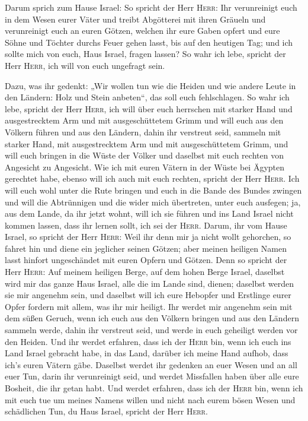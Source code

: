  Darum sprich zum Hause Israel: So spricht der Herr
\textsc{Herr}: Ihr verunreinigt euch in dem Wesen eurer Väter und treibt
Abgötterei mit ihren Gräueln  und verunreinigt euch an
euren Götzen, welchen ihr eure Gaben opfert und eure Söhne und Töchter
durchs Feuer gehen lasst, bis auf den heutigen Tag; und ich sollte mich
von euch, Haus Israel, fragen lassen? So wahr ich lebe, spricht der Herr
\textsc{Herr}, ich will von euch ungefragt sein.

 Dazu, was ihr gedenkt: „Wir wollen tun wie die Heiden
und wie andere Leute in den Ländern: Holz und Stein anbeten``, das soll
euch fehlschlagen.  So wahr ich lebe, spricht der Herr
\textsc{Herr}, ich will über euch herrschen mit starker Hand und
ausgestrecktem Arm und mit ausgeschüttetem Grimm  und
will euch aus den Völkern führen und aus den Ländern, dahin ihr
verstreut seid, sammeln mit starker Hand, mit ausgestrecktem Arm und mit
ausgeschüttetem Grimm,  und will euch bringen in die
Wüste der Völker und daselbst mit euch rechten von Angesicht zu
Angesicht.  Wie ich mit euren Vätern in der Wüste bei
Ägypten gerechtet habe, ebenso will ich auch mit euch rechten, spricht
der Herr \textsc{Herr}.  Ich will euch wohl unter die
Rute bringen und euch in die Bande des Bundes zwingen 
und will die Abtrünnigen und die wider mich übertreten, unter euch
ausfegen; ja, aus dem Lande, da ihr jetzt wohnt, will ich sie führen und
ins Land Israel nicht kommen lassen, dass ihr lernen sollt, ich sei der
\textsc{Herr}.  Darum, ihr vom Hause Israel, so spricht
der Herr \textsc{Herr}: Weil ihr denn mir ja nicht wollt gehorchen, so
fahret hin und diene ein jeglicher seinen Götzen; aber meinen heiligen
Namen lasst hinfort ungeschändet mit euren Opfern und Götzen.
 Denn so spricht der Herr \textsc{Herr}: Auf meinem
heiligen Berge, auf dem hohen Berge Israel, daselbst wird mir das ganze
Haus Israel, alle die im Lande sind, dienen; daselbst werden sie mir
angenehm sein, und daselbst will ich eure Hebopfer und Erstlinge eurer
Opfer fordern mit allem, was ihr mir heiligt.  Ihr werdet
mir angenehm sein mit dem süßen Geruch, wenn ich euch aus den Völkern
bringen und aus den Ländern sammeln werde, dahin ihr verstreut seid, und
werde in euch geheiligt werden vor den Heiden.  Und ihr
werdet erfahren, dass ich der \textsc{Herr} bin, wenn ich euch ins Land
Israel gebracht habe, in das Land, darüber ich meine Hand aufhob, dass
ich's euren Vätern gäbe.  Daselbst werdet ihr gedenken an
euer Wesen und an all euer Tun, darin ihr verunreinigt seid, und werdet
Missfallen haben über alle eure Bosheit, die ihr getan habt.
 Und werdet erfahren, dass ich der \textsc{Herr} bin,
wenn ich mit euch tue um meines Namens willen und nicht nach eurem bösen
Wesen und schädlichen Tun, du Haus Israel, spricht der Herr
\textsc{Herr}.

